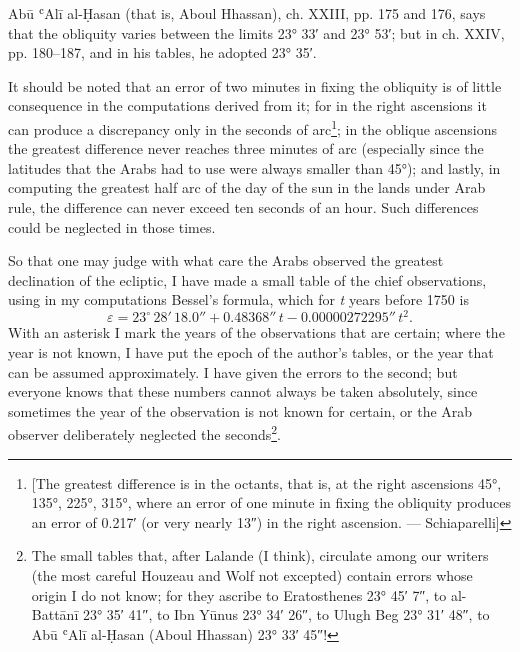 \documentclass[11pt]{article}
\newcommand{\Pg}[1]{\marginpar{\footnotesize\color{gray}#1}}
\begin{document}
\par Abū ʿAlī al-Ḥasan (that is, Aboul Hhassan), ch. XXIII, pp. 175 and 176, says that the obliquity varies between the limits 23° 33′ and 23° 53′; but in ch. XXIV, pp. 180–187, and in his tables, he adopted 23° 35′.\par
\par It should be noted that an error of two minutes in fixing the obliquity is of little consequence in the computations derived from it; for in the right ascensions it can produce a discrepancy only in the seconds of arc\footnote{[The greatest difference is in the octants, that is, at the right ascensions 45°, 135°, 225°, 315°, where an error of one minute in fixing the obliquity produces an error of 0.217′ (or very nearly 13″) in the right ascension. — Schiaparelli]}; in the oblique ascensions the greatest difference never reaches three minutes of arc (especially since the latitudes that the Arabs had to use were always smaller than 45°); and lastly, in computing the greatest half arc of the day of the sun in the lands under Arab rule, the difference can never exceed ten seconds of an hour. Such differences could be neglected in those times.\par
\par \Pg{I 160}So that one may judge with what care the Arabs observed the greatest declination of the ecliptic, I have made a small table of the chief observations, using in my computations Bessel's formula, which for \emph{t} years before 1750 is \[ \varepsilon = 23^\circ\,28'\,18.0'' + 0.48368''\,t - 0.00000272295''\,t^2. \] With an asterisk I mark the years of the observations that are certain; where the year is not known, I have put the epoch of the author's tables, or the year that can be assumed approximately. I have given the errors to the second; but everyone knows that these numbers cannot always be taken absolutely, since sometimes the year of the observation is not known for certain, or the Arab observer deliberately neglected the seconds\footnote{The small tables that, after Lalande (I think), circulate among our writers (the most careful Houzeau and Wolf not excepted) contain errors whose origin I do not know; for they ascribe to Eratosthenes 23° 45′ 7″, to al-Battānī 23° 35′ 41″, to Ibn Yūnus 23° 34′ 26″, to Ulugh Beg 23° 31′ 48″, to Abū ʿAlī al-Ḥasan (Aboul Hhassan) 23° 33′ 45″!}.\par
\end{document}
